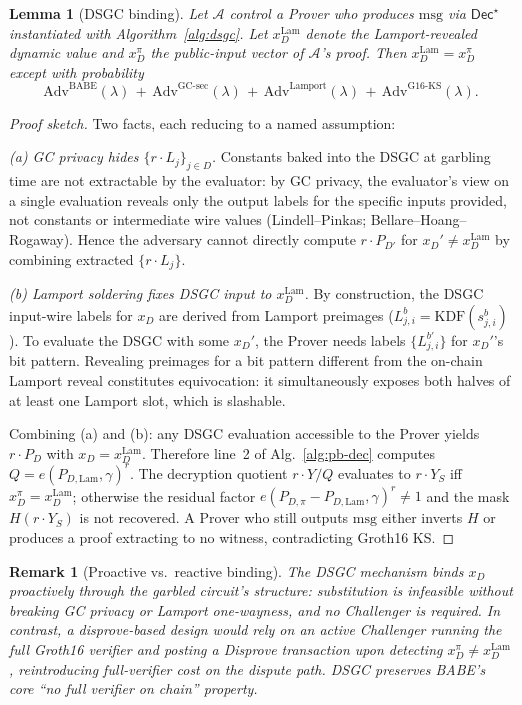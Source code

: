 \documentclass[11pt]{article}
\newtheorem{lemma}{Lemma}
\newtheorem{remark}{Remark}
\newcommand{\msg}{\mathrm{msg}}
\newcommand{\Dec}{\mathsf{Dec}}
\newcommand{\Adv}{\mathrm{Adv}}
\begin{document}
\begin{lemma}[DSGC binding]\label{lem:dsgc-binding}
Let $\mathcal{A}$ control a Prover who produces $\msg$ via
$\Dec^\star$ instantiated with Algorithm~\ref{alg:dsgc}. Let
$x_D^{\mathrm{Lam}}$ denote the Lamport-revealed dynamic value and
$x_D^{\pi}$ the public-input vector of $\mathcal{A}$'s proof.
Then $x_D^{\mathrm{Lam}} = x_D^{\pi}$ except with probability
\[
  \Adv^{\mathrm{BABE}}(\lambda) \,+\, \Adv^{\mathrm{GC\text{-}sec}}(\lambda)
  \,+\, \Adv^{\mathrm{Lamport}}(\lambda) \,+\, \Adv^{\mathrm{G16\text{-}KS}}(\lambda).
\]
\end{lemma}

\begin{proof}[Proof sketch]
Two facts, each reducing to a named assumption:

\emph{(a) GC privacy hides $\{r \cdot L_j\}_{j \in D}$.} Constants
baked into the DSGC at garbling time are not extractable by the
evaluator: by GC privacy, the evaluator's view on a single
evaluation reveals only the output labels for the specific inputs
provided, not constants or intermediate wire values
(Lindell--Pinkas; Bellare--Hoang--Rogaway). Hence the adversary
cannot directly compute $r \cdot P_{D'}$ for $x_D' \neq x_D^{\mathrm{Lam}}$
by combining extracted $\{r \cdot L_j\}$.

\emph{(b) Lamport soldering fixes DSGC input to $x_D^{\mathrm{Lam}}$.}
By construction, the DSGC input-wire labels for $x_D$ are derived
from Lamport preimages ($L_{j,i}^b = \mathrm{KDF}(s_{j,i}^b)$). To
evaluate the DSGC with some $x_D'$, the Prover needs labels
$\{L_{j,i}^{b'}\}$ for $x_D'$'s bit pattern. Revealing preimages for
a bit pattern different from the on-chain Lamport reveal constitutes
equivocation: it simultaneously exposes both halves of at least one
Lamport slot, which is slashable.

Combining (a) and (b): any DSGC evaluation accessible to the Prover
yields $r \cdot P_D$ with $x_D = x_D^{\mathrm{Lam}}$. Therefore line~2
of Alg.~\ref{alg:pb-dec} computes
$Q = e(P_{D, \mathrm{Lam}}, \gamma)^r$. The decryption quotient
$r \cdot Y / Q$ evaluates to $r \cdot Y_S$ iff
$x_D^{\pi} = x_D^{\mathrm{Lam}}$; otherwise the residual factor
$e(P_{D, \pi} - P_{D, \mathrm{Lam}}, \gamma)^r \neq 1$ and the mask
$H(r \cdot Y_S)$ is not recovered. A Prover who still outputs $\msg$
either inverts $H$ or produces a proof extracting to no witness,
contradicting Groth16 KS.
\end{proof}

\begin{remark}[Proactive vs.\ reactive binding]
The DSGC mechanism binds $x_D$ proactively through the garbled
circuit's structure: substitution is infeasible without breaking GC
privacy or Lamport one-wayness, and no Challenger is required. In
contrast, a disprove-based design would rely on an active Challenger
running the full Groth16 verifier and posting a Disprove transaction
upon detecting $x_D^{\pi} \neq x_D^{\mathrm{Lam}}$, reintroducing
full-verifier cost on the dispute path. DSGC preserves BABE's core
``no full verifier on chain'' property.
\end{remark}
\end{document}
